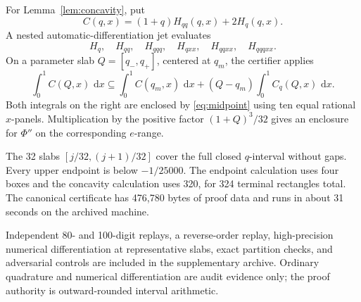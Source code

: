 \documentclass[11pt]{article}
\numberwithin{equation}{section}
\theoremstyle{remark}
\newcommand{\dd}{\,\mathrm d}
\begin{document}
For Lemma~\ref{lem:concavity}, put
\[
  C(q,x)=(1+q)H_{qq}(q,x)+2H_q(q,x).
\]
A nested automatic-differentiation jet evaluates
\[
H_q,\quad H_{qq},\quad H_{qqq},\quad
H_{qxx},\quad H_{qqxx},\quad H_{qqqxx}.
\]
On a parameter slab \(Q=[q_-,q_+]\), centered at \(q_m\), the certifier applies
\begin{equation}
  \int_0^1C(Q,x)\,\dd x
  \subseteq
  \int_0^1C(q_m,x)\,\dd x
  +(Q-q_m)\int_0^1C_q(Q,x)\,\dd x.
  \label{eq:concavity-mean-value}
\end{equation}
Both integrals on the right are enclosed by \eqref{eq:midpoint} using ten equal rational \(x\)-panels. Multiplication by the positive factor \((1+Q)^3/32\) gives an enclosure for \(\Phi''\) on the corresponding \(e\)-range.

The 32 slabs \([j/32,(j+1)/32]\) cover the full closed \(q\)-interval without gaps. Every upper endpoint is below \(-1/25000\). The endpoint calculation uses four boxes and the concavity calculation uses 320, for 324 terminal rectangles total. The canonical certificate has 476,780 bytes of proof data and runs in about 31 seconds on the archived machine.

Independent 80- and 100-digit replays, a reverse-order replay, high-precision numerical differentiation at representative slabs, exact partition checks, and adversarial controls are included in the supplementary archive. Ordinary quadrature and numerical differentiation are audit evidence only; the proof authority is outward-rounded interval arithmetic.
\end{document}
